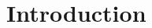 \documentclass[12pt]{article}
\begin{document}

\section{Introduction}
\label{sec:intro}


\clearpage
\begin{multicols}{2}
	\begin{scriptsize}
		\begin{singlespace}
			
			
		\end{singlespace}
	\end{scriptsize}
\end{multicols}
%	
	
\end{document}
